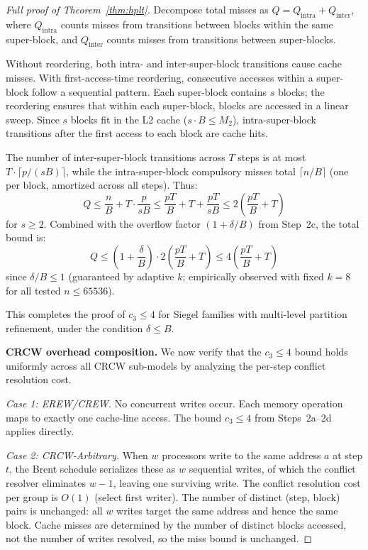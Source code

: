 \documentclass[11pt]{article}
\begin{document}
\begin{proof}[Full proof of Theorem~\ref{thm:hplt}]
Decompose total misses as $Q = Q_{\text{intra}} + Q_{\text{inter}}$, where
$Q_{\text{intra}}$ counts misses from transitions between blocks within the
same super-block, and $Q_{\text{inter}}$ counts misses from transitions
between super-blocks.

Without reordering, both intra- and inter-super-block transitions cause
cache misses.  With first-access-time reordering, consecutive accesses
within a super-block follow a sequential pattern.  Each super-block
contains $s$ blocks; the reordering ensures that within each super-block,
blocks are accessed in a linear sweep.  Since $s$ blocks fit in the L2
cache ($s \cdot B \le M_2$), intra-super-block transitions after the first
access to each block are cache hits.

The number of inter-super-block transitions across $T$ steps is at most
$T \cdot \lceil p/(sB) \rceil$, while the intra-super-block compulsory
misses total $\lceil n/B \rceil$ (one per block, amortized across all
steps).  Thus:
\[
  Q \le \frac{n}{B} + T \cdot \frac{p}{sB}
    \le \frac{pT}{B} + T + \frac{pT}{sB}
    \le 2\left(\frac{pT}{B} + T\right)
\]
for $s \ge 2$.  Combined with the overflow factor $(1 + \delta/B)$ from
Step~2c, the total bound is:
\[
  Q \le \left(1 + \frac{\delta}{B}\right) \cdot 2\left(\frac{pT}{B} + T\right)
    \le 4\left(\frac{pT}{B} + T\right)
\]
since $\delta/B \le 1$ (guaranteed by adaptive $k$; empirically observed
with fixed $k = 8$ for all tested $n \le 65536$).

This completes the proof of $c_3 \le 4$ for Siegel families with
multi-level partition refinement, under the condition $\delta \le B$.

\medskip
\textbf{CRCW overhead composition.}
We now verify that the $c_3 \le 4$ bound holds uniformly across all CRCW
sub-models by analyzing the per-step conflict resolution cost.

\emph{Case 1: EREW/CREW.}  No concurrent writes occur.  Each memory
operation maps to exactly one cache-line access.  The bound $c_3 \le 4$
from Steps~2a--2d applies directly.

\emph{Case 2: CRCW-Arbitrary.}  When $w$ processors write to the same
address $a$ at step $t$, the Brent schedule serializes these as $w$
sequential writes, of which the conflict resolver eliminates $w - 1$,
leaving one surviving write.  The conflict resolution cost per group is
$O(1)$ (select first writer).  The number of distinct (step, block) pairs
is unchanged: all $w$ writes target the same address and hence the same
block.  Cache misses are determined by the number of distinct blocks
accessed, not the number of writes resolved, so the miss bound is
unchanged.


\end{proof}
\end{document}
